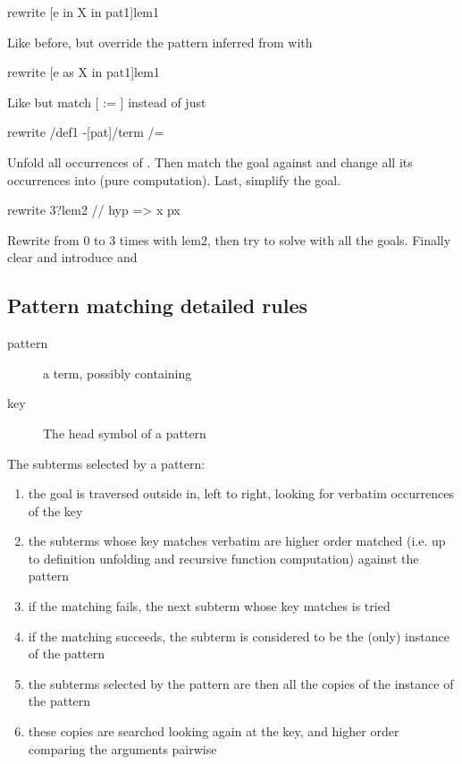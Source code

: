 \begin{landscape}
\begin{small}
\begin{multicols*}{3}[\begin{center}\section*{}\end{center}]
\begin{cheat}
rewrite [e in X in pat1]lem1
\end{cheat}
  Like before, but override the pattern inferred from  with

\begin{cheat}
rewrite [e as X in pat1]lem1
\end{cheat}
  Like  but match
  [ := ] instead of just 

\begin{cheat}
rewrite /def1 -[pat]/term /=
\end{cheat}
  Unfold all occurrences of . Then match the goal against 
  and change all its occurrences into  (pure computation). Last,
  simplify the goal.

\begin{cheat}
rewrite 3?lem2 // {hyp} => x px
\end{cheat}
  Rewrite from 0 to 3 times with lem2, then
  try to solve with  all the goals. Finally clear 
  and introduce  and 

\subsection*{Pattern matching detailed rules}

\begin{description}
\item[pattern] a term, possibly containing \C{_}
\item[key] The head symbol of a pattern
\end{description}

The subterms selected by a pattern:
\begin{enumerate}
\item the goal is traversed outside in, left to right, looking for
      verbatim occurrences of the key
\item the subterms whose key matches verbatim are higher order
      matched (i.e. up to definition unfolding and recursive function
      computation) against the pattern
\item if the matching fails, the next subterm whose key matches is tried
\item if the matching succeeds, the subterm is considered to be the
      (only) instance of the pattern
\item the subterms selected by the pattern are then all the copies of the
      instance of the pattern
\item these copies are searched looking again at the key, and higher order
      comparing the arguments pairwise
\end{enumerate}


\end{multicols*}
\end{small}
\end{landscape}
